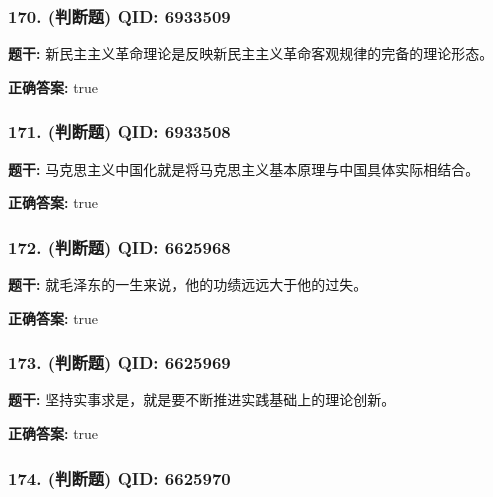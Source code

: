 \documentclass[12pt,UTF8]{ctexart}
\begin{document}
\subsubsection*{170. (判断题) \small QID: 6933509}

\textbf{题干:}
新民主主义革命理论是反映新民主主义革命客观规律的完备的理论形态。

\textbf{正确答案:}
true

\vspace{0.3em}\hrulefill\vspace{0.7em}

\subsubsection*{171. (判断题) \small QID: 6933508}

\textbf{题干:}
马克思主义中国化就是将马克思主义基本原理与中国具体实际相结合。

\textbf{正确答案:}
true

\vspace{0.3em}\hrulefill\vspace{0.7em}

\subsubsection*{172. (判断题) \small QID: 6625968}

\textbf{题干:}
就毛泽东的一生来说，他的功绩远远大于他的过失。

\textbf{正确答案:}
true

\vspace{0.3em}\hrulefill\vspace{0.7em}

\subsubsection*{173. (判断题) \small QID: 6625969}

\textbf{题干:}
坚持实事求是，就是要不断推进实践基础上的理论创新。

\textbf{正确答案:}
true

\vspace{0.3em}\hrulefill\vspace{0.7em}

\subsubsection*{174. (判断题) \small QID: 6625970}
\end{document}
